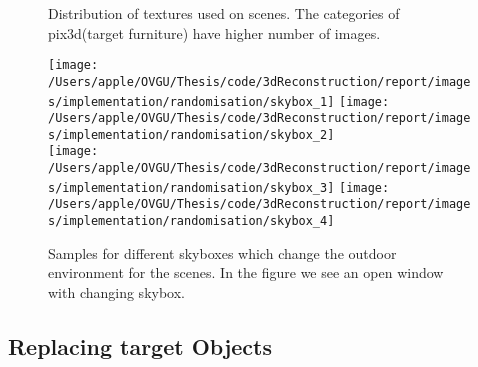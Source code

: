 
\begin{figure}[!ht]
    \centering
    \resizebox{\textwidth}{!}{}
    \caption{Distribution of textures used on scenes. The categories of pix3d(target furniture) have higher number of images.}
    \label{fig:Distribution of textures}
\end{figure}

\begin{figure}
    \centering
        \texttt{[image: /Users/apple/OVGU/Thesis/code/3dReconstruction/report/images/implementation/randomisation/skybox\_1]}
        \texttt{[image: /Users/apple/OVGU/Thesis/code/3dReconstruction/report/images/implementation/randomisation/skybox\_2]} \\
        \vspace{0.1cm}
        \texttt{[image: /Users/apple/OVGU/Thesis/code/3dReconstruction/report/images/implementation/randomisation/skybox\_3]}
        \texttt{[image: /Users/apple/OVGU/Thesis/code/3dReconstruction/report/images/implementation/randomisation/skybox\_4]}\\
    \caption{Samples for different skyboxes which change the outdoor environment for the scenes. In the figure we see an open window with changing skybox.}
    \label{fig:skybox samples}
\end{figure}

\subsection{Replacing target Objects}\label{subsec:replacing-target-objects}

